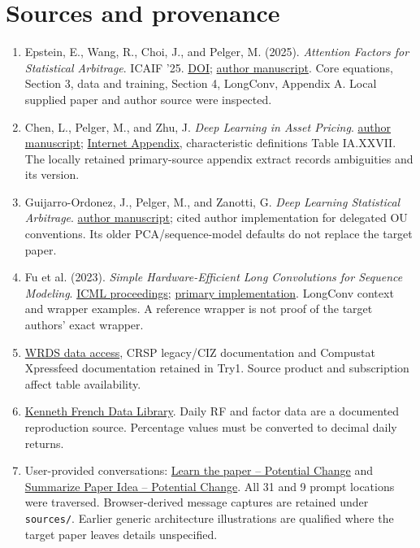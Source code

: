 \documentclass[11pt]{article}
\begin{document}
\section{Sources and provenance}
\begin{enumerate}
\item Epstein, E., Wang, R., Choi, J., and Pelger, M. (2025). \emph{Attention Factors for Statistical Arbitrage}. ICAIF '25. \href{https://doi.org/10.1145/3768292.3770398}{DOI}; \href{https://arxiv.org/abs/2510.11616}{author manuscript}. Core equations, Section 3, data and training, Section 4, LongConv, Appendix A. Local supplied paper and author source were inspected.
\item Chen, L., Pelger, M., and Zhu, J. \emph{Deep Learning in Asset Pricing}. \href{https://arxiv.org/abs/1904.00745}{author manuscript}; \href{https://pubsonline.informs.org/doi/suppl/10.1287/mnsc.2023.4695/suppl_file/mnsc.2023.4695.sm1.pdf}{Internet Appendix}, characteristic definitions Table IA.XXVII. The locally retained primary-source appendix extract records ambiguities and its version.
\item Guijarro-Ordonez, J., Pelger, M., and Zanotti, G. \emph{Deep Learning Statistical Arbitrage}. \href{https://arxiv.org/abs/2106.04028}{author manuscript}; cited author implementation for delegated OU conventions. Its older PCA/sequence-model defaults do not replace the target paper.
\item Fu et al. (2023). \emph{Simple Hardware-Efficient Long Convolutions for Sequence Modeling}. \href{https://proceedings.mlr.press/v202/fu23a.html}{ICML proceedings}; \href{https://github.com/HazyResearch/safari}{primary implementation}. LongConv context and wrapper examples. A reference wrapper is not proof of the target authors' exact wrapper.
\item \href{https://wrds-www.wharton.upenn.edu/pages/get-data/}{WRDS data access}, CRSP legacy/CIZ documentation and Compustat Xpressfeed documentation retained in Try1. Source product and subscription affect table availability.
\item \href{https://mba.tuck.dartmouth.edu/pages/faculty/ken.french/data_library.html}{Kenneth French Data Library}. Daily RF and factor data are a documented reproduction source. Percentage values must be converted to decimal daily returns.
\item User-provided conversations: \href{https://chatgpt.com/share/6ac12191-42e0-83e9-8fb0-137caf242679}{Learn the paper -- Potential Change} and \href{https://chatgpt.com/share/6ac121b5-9a30-83e9-b7f6-cb7297b2e6c4}{Summarize Paper Idea -- Potential Change}. All 31 and 9 prompt locations were traversed. Browser-derived message captures are retained under \texttt{sources/}. Earlier generic architecture illustrations are qualified where the target paper leaves details unspecified.

\end{enumerate}
\end{document}
